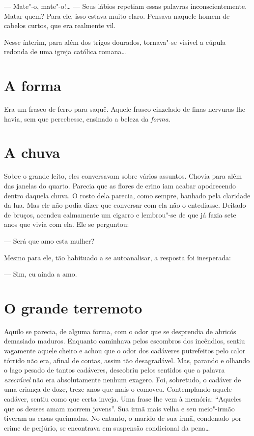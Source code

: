 --- Mate"-o, mate"-o!\ldots{} --- Seus lábios repetiam essas palavras
inconscientemente. Matar quem? Para ele, isso estava muito claro.
Pensava naquele homem de cabelos curtos, que era realmente vil.

Nesse ínterim, para além dos trigos dourados, tornava"-se visível a
cúpula redonda de uma igreja católica romana\ldots{}

\section{A forma}

Era um frasco de ferro para saquê. Aquele frasco cinzelado de finas
nervuras lhe havia, sem que percebesse, ensinado a beleza da \textit{forma}.

\section{A chuva}

Sobre o grande leito, eles conversavam sobre vários assuntos. Chovia
para além das janelas do quarto. Parecia que as flores de crino iam
acabar apodrecendo dentro daquela chuva. O rosto dela parecia, como
sempre, banhado pela claridade da lua. Mas ele não podia dizer que
conversar com ela não o entediasse. Deitado de bruços, acendeu
calmamente um cigarro e lembrou"-se de que já fazia sete anos que vivia
com ela. Ele se perguntou:

--- Será que amo esta mulher?

Mesmo para ele, tão habituado a se autoanalisar, a resposta foi
inesperada:

--- Sim, eu ainda a amo.

\section{O grande terremoto\footnotemark}


Aquilo se parecia, de alguma forma, com o odor que se desprendia de
abricós demasiado maduros. Enquanto caminhava pelos escombros dos
incêndios, sentiu vagamente aquele cheiro e achou que o odor dos
cadáveres putrefeitos pelo calor tórrido não era, afinal de contas,
assim tão desagradável. Mas, parando e olhando o lago pesado de tantos
cadáveres, descobriu pelos sentidos que a palavra \textit{execrável} não era
absolutamente nenhum exagero. Foi, sobretudo, o cadáver de uma criança
de doze, treze anos que mais o comoveu. Contemplando aquele cadáver,
sentiu como que certa inveja. Uma frase lhe vem à memória: ``Aqueles que
os deuses amam morrem jovens''. Sua irmã mais velha e seu meio"-irmão
tiveram as casas queimadas. No entanto, o marido de sua irmã, condenado
por crime de perjúrio, se encontrava em suspensão condicional da pena\ldots{}

